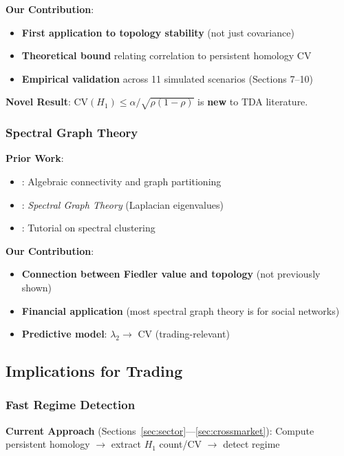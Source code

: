 \textbf{Our Contribution}:
\begin{itemize}
\item \checkmark \textbf{First application to topology stability} (not just covariance)
\item \checkmark \textbf{Theoretical bound} relating correlation to persistent homology CV
\item \checkmark \textbf{Empirical validation} across 11 simulated scenarios (Sections 7--10)
\end{itemize}

\textbf{Novel Result}: $\text{CV}(H_1) \leq \alpha/\sqrt{\rho(1-\rho)}$ is \textbf{new} to TDA literature.

\subsubsection{Spectral Graph Theory}

\textbf{Prior Work}:
\begin{itemize}
\item \citet{Fiedler1973}: Algebraic connectivity and graph partitioning
\item \citet{Chung1997}: \textit{Spectral Graph Theory} (Laplacian eigenvalues)
\item \citet{VonLuxburg2007}: Tutorial on spectral clustering
\end{itemize}

\textbf{Our Contribution}:
\begin{itemize}
\item \checkmark \textbf{Connection between Fiedler value and topology} (not previously shown)
\item \checkmark \textbf{Financial application} (most spectral graph theory is for social networks)
\item \checkmark \textbf{Predictive model}: $\lambda_2 \rightarrow$ CV (trading-relevant)
\end{itemize}

\subsection{Implications for Trading}

\subsubsection{Fast Regime Detection}

\textbf{Current Approach} (Sections~\ref{sec:sector}---\ref{sec:crossmarket}): Compute persistent homology $\rightarrow$ extract $H_1$ count/CV $\rightarrow$ detect regime

